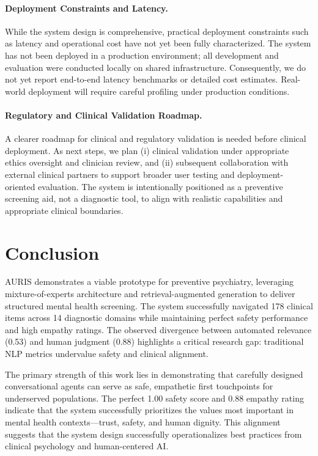 \documentclass[sigconf]{acmart}
\begin{document}
\paragraph{Deployment Constraints and Latency.} While the system design is comprehensive, practical deployment constraints such as latency and operational cost have not yet been fully characterized. The system has not been deployed in a production environment; all development and evaluation were conducted locally on shared infrastructure. Consequently, we do not yet report end-to-end latency benchmarks or detailed cost estimates. Real-world deployment will require careful profiling under production conditions.

\paragraph{Regulatory and Clinical Validation Roadmap.} A clearer roadmap for clinical and regulatory validation is needed before clinical deployment. As next steps, we plan (i) clinical validation under appropriate ethics oversight and clinician review, and (ii) subsequent collaboration with external clinical partners to support broader user testing and deployment-oriented evaluation. The system is intentionally positioned as a preventive screening aid, not a diagnostic tool, to align with realistic capabilities and appropriate clinical boundaries.

\section{Conclusion}

AURIS demonstrates a viable prototype for preventive psychiatry, leveraging mixture-of-experts architecture and retrieval-augmented generation to deliver structured mental health screening. The system successfully navigated 178 clinical items across 14 diagnostic domains while maintaining perfect safety performance and high empathy ratings. The observed divergence between automated relevance (0.53) and human judgment (0.88) highlights a critical research gap: traditional NLP metrics undervalue safety and clinical alignment.

The primary strength of this work lies in demonstrating that carefully designed conversational agents can serve as safe, empathetic first touchpoints for underserved populations. The perfect 1.00 safety score and 0.88 empathy rating indicate that the system successfully prioritizes the values most important in mental health contexts---trust, safety, and human dignity. This alignment suggests that the system design successfully operationalizes best practices from clinical psychology and human-centered AI.
\end{document}
